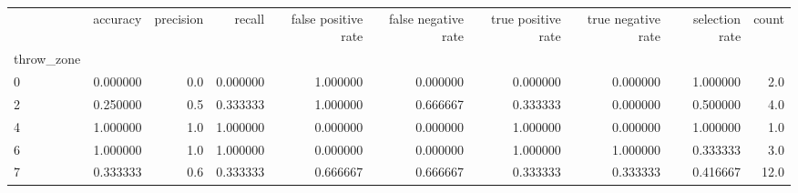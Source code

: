 \begin{tabular}{lrrrrrrrrr}
\toprule
{} &  accuracy &  precision &    recall &  false positive rate &  false negative rate &  true positive rate &  true negative rate &  selection rate &  count \\
throw\_zone &           &            &           &                      &                      &                     &                     &                 &        \\
\midrule
0          &  0.000000 &        0.0 &  0.000000 &             1.000000 &             0.000000 &            0.000000 &            0.000000 &        1.000000 &    2.0 \\
2          &  0.250000 &        0.5 &  0.333333 &             1.000000 &             0.666667 &            0.333333 &            0.000000 &        0.500000 &    4.0 \\
4          &  1.000000 &        1.0 &  1.000000 &             0.000000 &             0.000000 &            1.000000 &            0.000000 &        1.000000 &    1.0 \\
6          &  1.000000 &        1.0 &  1.000000 &             0.000000 &             0.000000 &            1.000000 &            1.000000 &        0.333333 &    3.0 \\
7          &  0.333333 &        0.6 &  0.333333 &             0.666667 &             0.666667 &            0.333333 &            0.333333 &        0.416667 &   12.0 \\
\bottomrule
\end{tabular}
